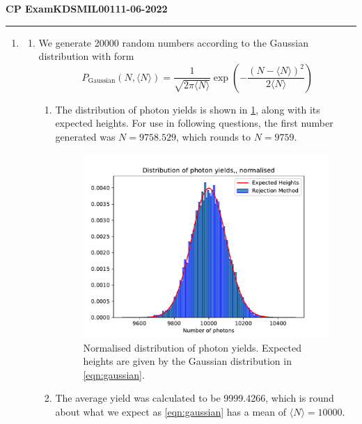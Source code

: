 \documentclass[11pt]{article}
\begin{document}
\begin{center}
    \textbf{CP Exam}\hspace{1.5in}\textbf{KDSMIL001}\hspace{1.5in}\textbf{11-06-2022}
\end{center}
\rule{\textwidth}{1pt}

\begin{enumerate}
    \item \begin{enumerate}
        \item We generate \num[]{20000} random numbers according to the Gaussian distribution with form 
        \begin{equation}
            P_{\mathrm{Gaussian}}(N,\langle N \rangle)=\frac{1}{\sqrt{2\pi\langle N \rangle}}\exp\left(-\frac{(N-\langle N \rangle)^2}{2\langle N \rangle}\right)
            \label{eqn:gaussian}
        \end{equation}

        \begin{enumerate}
            \item The distribution of photon yields is shown in \cref{fig:q1a}, along with its expected heights. For use in following questions, the first number generated was $N=\num[]{9758.529}$, which rounds to $N=\num[]{9759}$.

            \begin{figure}[H]
                \begin{center}
                    \includegraphics[width=.6\textwidth]{Plots/q1a.pdf}
                    \caption{Normalised distribution of photon yields. Expected heights are given by the Gaussian distribution in \cref{eqn:gaussian}.}
                    \label{fig:q1a}
                \end{center}
            \end{figure}
            
            \item The average yield was calculated to be \num[]{9999.4266}, which is round about what we expect as \cref{eqn:gaussian} has a mean of $\langle N \rangle=\num{10000}$.
            

\end{enumerate}
\end{enumerate}
\end{enumerate}
\end{document}
